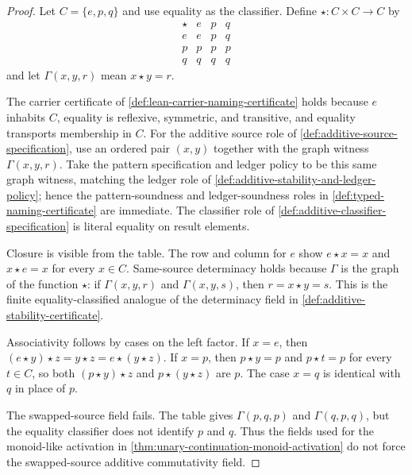 \begin{proof}
Let $C=\{e,p,q\}$ and use equality as the classifier. Define $\star:C\times C\to C$ by
$$
\begin{array}{c|ccc}
\star & e & p & q\\
\hline
e & e & p & q\\
p & p & p & p\\
q & q & q & q
\end{array}
$$
and let $\Gamma(x,y,r)$ mean $x\star y=r$.

The carrier certificate of \autoref{def:lean-carrier-naming-certificate} holds because $e$ inhabits $C$, equality is reflexive, symmetric, and transitive, and equality transports membership in $C$. For the additive source role of \autoref{def:additive-source-specification}, use an ordered pair $(x,y)$ together with the graph witness $\Gamma(x,y,r)$. Take the pattern specification and ledger policy to be this same graph witness, matching the ledger role of \autoref{def:additive-stability-and-ledger-policy}; hence the pattern-soundness and ledger-soundness roles in \autoref{def:typed-naming-certificate} are immediate. The classifier role of \autoref{def:additive-classifier-specification} is literal equality on result elements.

Closure is visible from the table. The row and column for $e$ show $e\star x=x$ and $x\star e=x$ for every $x\in C$. Same-source determinacy holds because $\Gamma$ is the graph of the function $\star$: if $\Gamma(x,y,r)$ and $\Gamma(x,y,s)$, then $r=x\star y=s$. This is the finite equality-classified analogue of the determinacy field in \autoref{def:additive-stability-certificate}.

Associativity follows by cases on the left factor. If $x=e$, then $(e\star y)\star z=y\star z=e\star(y\star z)$. If $x=p$, then $p\star y=p$ and $p\star t=p$ for every $t\in C$, so both $(p\star y)\star z$ and $p\star(y\star z)$ are $p$. The case $x=q$ is identical with $q$ in place of $p$.

The swapped-source field fails. The table gives $\Gamma(p,q,p)$ and $\Gamma(q,p,q)$, but the equality classifier does not identify $p$ and $q$. Thus the fields used for the monoid-like activation in \autoref{thm:unary-continuation-monoid-activation} do not force the swapped-source additive commutativity field.
\end{proof}

